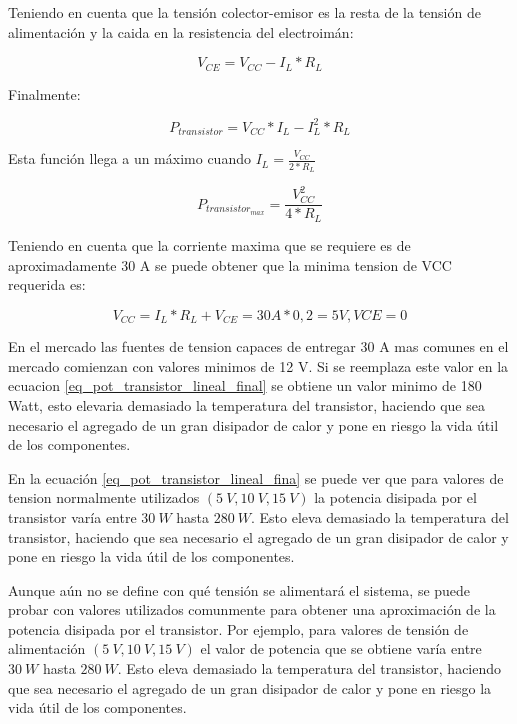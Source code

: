 Teniendo en cuenta que la tensión colector-emisor es la resta de la tensión de alimentación y la caida en la resistencia del electroimán:

\begin{equation}
	V_{CE}=V_{CC}-I_L*R_L
\end{equation}

Finalmente:

\begin{equation}
	P_{transistor}=V_{CC}*I_L-I_L^2*R_L
\end{equation}

Esta función llega a un máximo cuando $I_L=\frac{V_{CC}}{2*R_L}$


\begin{equation}\label{eq_pot_transistor_lineal_final}
	P_{transistor_{max}}=\frac{V_{CC}^2}{4*R_L}
\end{equation}

Teniendo en cuenta que la corriente maxima que se requiere es de aproximadamente 30 A se puede obtener que la minima tension de VCC requerida es:

\begin{equation}
	V_{CC}=I_L*R_L+V_{CE}=30 A * 0,2  = 5 V, VCE=0
\end{equation}

En el mercado las fuentes de tension capaces de entregar 30 A mas comunes en el mercado comienzan con valores minimos de 12 V. Si se reemplaza este valor en la ecuacion  \ref{eq_pot_transistor_lineal_final} se obtiene un valor minimo de 180 Watt, esto elevaria demasiado la temperatura del transistor, haciendo que sea necesario el agregado de un gran disipador de calor y pone en riesgo la vida útil de los componentes.
  
En la ecuación \ref{eq_pot_transistor_lineal_fina} se puede ver que para valores de tension normalmente utilizados $(5\:V,10\:V,15\:V)$ la potencia disipada por el transistor varía entre $30\:W$ hasta $280\:W$. Esto eleva demasiado la temperatura del transistor, haciendo que sea necesario el agregado de un gran disipador de calor y pone en riesgo la vida útil de los componentes.

Aunque aún no se define con qué tensión se alimentará el sistema, se puede probar con valores utilizados comunmente para obtener una aproximación de la potencia disipada por el transistor. Por ejemplo, para valores de tensión de alimentación $(5\:V,10\:V,15\:V)$ el valor de potencia que se obtiene varía entre $30\:W$ hasta $280\:W$. Esto eleva demasiado la temperatura del transistor, haciendo que sea necesario el agregado de un gran disipador de calor y pone en riesgo la vida útil de los componentes.

